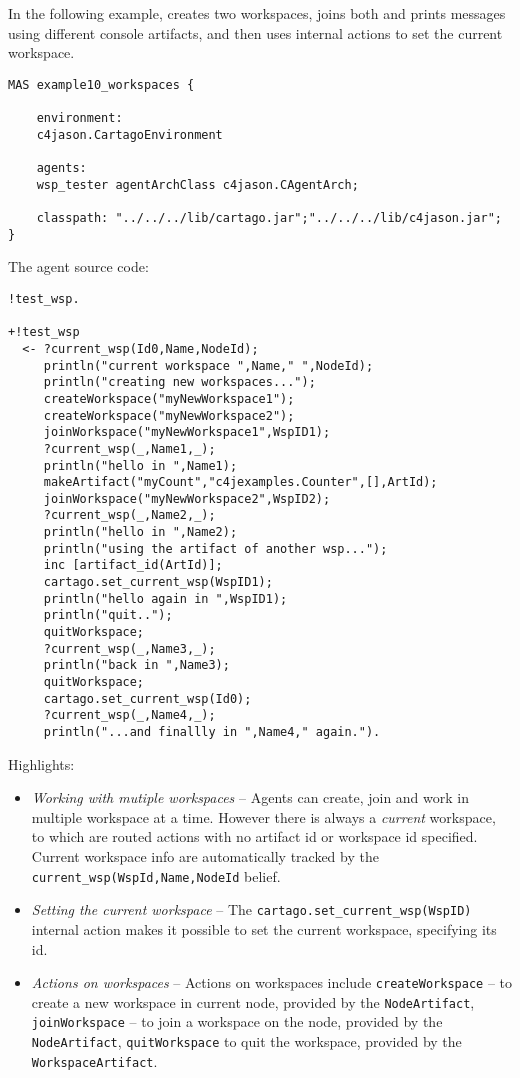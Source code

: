 \documentclass[11pt]{report}
\newcommand\code[1]{{\small{\mbox{\texttt{{#1}}}}}}
\begin{document}
In the following example, creates two workspaces, joins both and prints messages using 
different console artifacts, and then uses internal actions to set the current workspace.

{\small{
\begin{verbatim}
MAS example10_workspaces {

    environment: 
    c4jason.CartagoEnvironment

    agents: 
    wsp_tester agentArchClass c4jason.CAgentArch;

    classpath: "../../../lib/cartago.jar";"../../../lib/c4jason.jar";    
}
\end{verbatim}}}
%
\noindent The agent source code:
%
{\small{\begin{verbatim}
!test_wsp. 

+!test_wsp 
  <- ?current_wsp(Id0,Name,NodeId);
     println("current workspace ",Name," ",NodeId);  
     println("creating new workspaces...");
     createWorkspace("myNewWorkspace1");
     createWorkspace("myNewWorkspace2");
     joinWorkspace("myNewWorkspace1",WspID1);
     ?current_wsp(_,Name1,_);
     println("hello in ",Name1);
     makeArtifact("myCount","c4jexamples.Counter",[],ArtId);
     joinWorkspace("myNewWorkspace2",WspID2);
     ?current_wsp(_,Name2,_);
     println("hello in ",Name2);
     println("using the artifact of another wsp...");
     inc [artifact_id(ArtId)];
     cartago.set_current_wsp(WspID1);
     println("hello again in ",WspID1);
     println("quit..");
     quitWorkspace;
     ?current_wsp(_,Name3,_);
     println("back in ",Name3);
     quitWorkspace;
     cartago.set_current_wsp(Id0);
     ?current_wsp(_,Name4,_);     
     println("...and finallly in ",Name4," again.").
\end{verbatim}}}
%

\noindent Highlights:
%
\begin{itemize}
%
\item \emph{Working with mutiple workspaces} -- Agents can create, join and work in multiple workspace at a time.
%
However there is always a \emph{current} workspace, to which are routed actions with no artifact id or workspace id  specified.
%
Current workspace info are automatically tracked by the \code{current\_wsp(WspId,Name,NodeId} belief.
%
\item \emph{Setting the current workspace} -- The \code{cartago.set\_current\_wsp(WspID)} internal action makes it possible to set the current workspace, specifying its id.

\item \emph{Actions on workspaces} -- Actions on workspaces include \code{createWorkspace} -- to create a new workspace in current node, provided by the \code{NodeArtifact}, \code{joinWorkspace} -- to join a workspace on the node, provided by the  \code{NodeArtifact}, \code{quitWorkspace} to quit the workspace, provided by the \code{WorkspaceArtifact}.

\end{itemize} 
\end{document}
